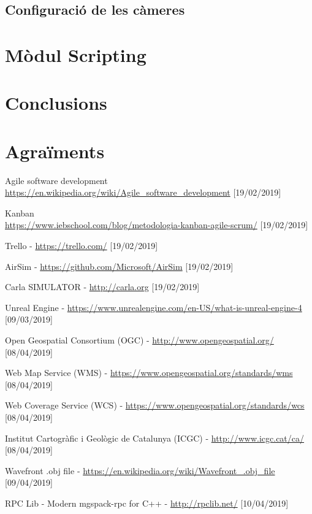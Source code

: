 \documentclass[10pt,a4paper,twocolumn,twoside]{article}
\begin{document}
\subsection{Configuració de les càmeres}
\label{section:cameraconfig}

\section{Mòdul Scripting}

\section{Conclusions}


\section*{Agraïments}


\begin{thebibliography}{11}
Agile software development
\\ \url{https://en.wikipedia.org/wiki/Agile_software_development}
[19/02/2019]

Kanban
\\ \url{https://www.iebschool.com/blog/metodologia-kanban-agile-scrum/} [19/02/2019]

Trello - \url{https://trello.com/} [19/02/2019]

AirSim - \url{https://github.com/Microsoft/AirSim} [19/02/2019]

Carla SIMULATOR - \url{http://carla.org} [19/02/2019]

Unreal Engine - \url{https://www.unrealengine.com/en-US/what-is-unreal-engine-4} [09/03/2019]

Open Geospatial Consortium (OGC) -  \url{http://www.opengeospatial.org/} [08/04/2019]

Web Map Service (WMS) -  \url{https://www.opengeospatial.org/standards/wms} [08/04/2019]

Web Coverage Service (WCS) -  \url{https://www.opengeospatial.org/standards/wcs} [08/04/2019]

Institut Cartogràfic i Geològic de Catalunya (ICGC) - \url{http://www.icgc.cat/ca/} [08/04/2019]

Wavefront .obj file - \url{https://en.wikipedia.org/wiki/Wavefront_.obj_file} [09/04/2019]

RPC Lib - Modern mgspack-rpc for C++ - \url{http://rpclib.net/} [10/04/2019]


\end{thebibliography}
\end{document}

